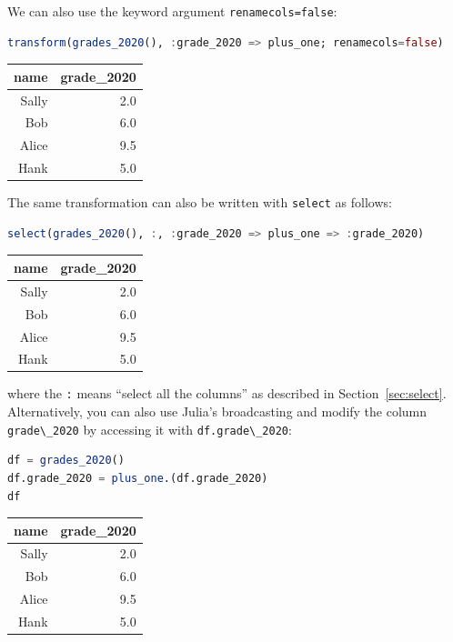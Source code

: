 \documentclass[
  notoc %
]{tufte-book}
\newcommand{\passthrough}[1]{#1}
\begin{document}
We can also use the keyword argument
\passthrough{\lstinline!renamecols=false!}:

\begin{lstlisting}[language=Julia]
transform(grades_2020(), :grade_2020 => plus_one; renamecols=false)
\end{lstlisting}

\begin{longtable}[]{@{}rr@{}}
\toprule()
name & grade\_2020 \\
\midrule()
\endhead
Sally & 2.0 \\
Bob & 6.0 \\
Alice & 9.5 \\
Hank & 5.0 \\
\bottomrule()
\end{longtable}

The same transformation can also be written with
\passthrough{\lstinline!select!} as follows:

\begin{lstlisting}[language=Julia]
select(grades_2020(), :, :grade_2020 => plus_one => :grade_2020)
\end{lstlisting}

\begin{longtable}[]{@{}rr@{}}
\toprule()
name & grade\_2020 \\
\midrule()
\endhead
Sally & 2.0 \\
Bob & 6.0 \\
Alice & 9.5 \\
Hank & 5.0 \\
\bottomrule()
\end{longtable}

where the \passthrough{\lstinline!:!} means ``select all the columns''
as described in Section~\ref{sec:select}. Alternatively, you can also
use Julia's broadcasting and modify the column
\passthrough{\lstinline!grade\_2020!} by accessing it with
\passthrough{\lstinline!df.grade\_2020!}:

\begin{lstlisting}[language=Julia]
df = grades_2020()
df.grade_2020 = plus_one.(df.grade_2020)
df
\end{lstlisting}

\begin{longtable}[]{@{}rr@{}}
\toprule()
name & grade\_2020 \\
\midrule()
\endhead
Sally & 2.0 \\
Bob & 6.0 \\
Alice & 9.5 \\
Hank & 5.0 \\
\bottomrule()
\end{longtable}
\end{document}
